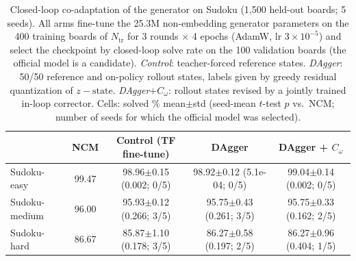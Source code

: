 \begin{table}[t]
\centering
\caption{Closed-loop co-adaptation of the generator on Sudoku (1{,}500 held-out boards; 5 seeds). All arms fine-tune the 25.3M non-embedding generator parameters on the 400 training boards of $N_{\mathrm{tr}}$ for 3 rounds $\times$ 4 epochs (AdamW, lr $3{\times}10^{-5}$) and select the checkpoint by closed-loop solve rate on the 100 validation boards (the official model is a candidate). \emph{Control}: teacher-forced reference states. \emph{DAgger}: 50/50 reference and on-policy rollout states, labels given by greedy residual quantization of $z-\text{state}$. \emph{DAgger}+$C_\omega$: rollout states revised by a jointly trained in-loop corrector. Cells: solved \% mean$\pm$std (seed-mean $t$-test $p$ vs.\ NCM; number of seeds for which the official model was selected).}
\label{tab:dagger}
\setlength{\tabcolsep}{4pt}
\begin{tabular}{lcccc}
\toprule
 & NCM & Control (TF fine-tune) & DAgger & DAgger + $C_\omega$\\
\midrule
Sudoku-easy & 99.47 & 98.96$\pm$0.15 (0.002; 0/5) & 98.92$\pm$0.12 (5.1e-04; 0/5) & 99.04$\pm$0.14 (0.002; 0/5)\\
Sudoku-medium & 96.00 & 95.93$\pm$0.12 (0.266; 3/5) & 95.75$\pm$0.43 (0.261; 3/5) & 95.75$\pm$0.33 (0.162; 2/5)\\
Sudoku-hard & 86.67 & 85.87$\pm$1.10 (0.178; 3/5) & 86.27$\pm$0.58 (0.197; 2/5) & 86.27$\pm$0.96 (0.404; 1/5)\\
\bottomrule
\end{tabular}
\end{table}
